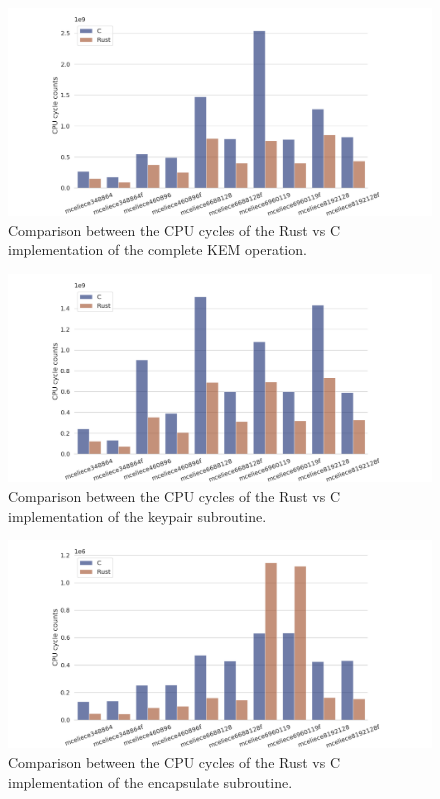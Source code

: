 \documentclass[11pt,
  oneside,openany,    %
]{scrreprt}
\begin{document}
\begin{figure}[H]
\centering
  \includegraphics[width=1\textwidth]{images/completeKEM.png}
  \caption{Comparison between the CPU cycles of the Rust vs C implementation of the complete KEM operation.}
  \label{fig:plot1}
\end{figure}

\begin{figure}[H]
\centering
  \includegraphics[width=1\textwidth]{images/keypair.png}
  \caption{Comparison between the CPU cycles of the Rust vs C implementation of the keypair subroutine.}
  \label{fig:plot1}
\end{figure}

\begin{figure}[H]
\centering
  \includegraphics[width=1\textwidth]{images/encapsulation.png}
  \caption{Comparison between the CPU cycles of the Rust vs C implementation of the encapsulate subroutine.}
  \label{fig:plot1}
\end{figure}
\end{document}

